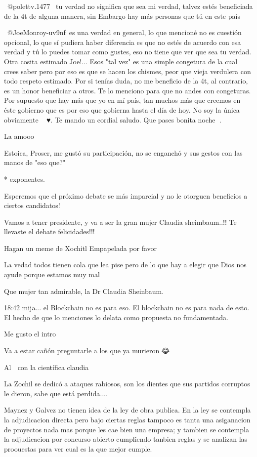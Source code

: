  @polettv.1477  tu verdad no significa que sea mi verdad, talvez estés beneficiada de la 4t de alguna manera, sin Embargo hay más personas que tú en este país

 @JoeMonroy-uv9nf es una verdad en general, lo que mencioné no es cuestión opcional, lo que sí pudiera haber diferencia es que no estés de acuerdo con esa verdad y tú lo puedes tomar como gustes, eso no tiene que ver que sea tu verdad. Otra cosita estimado Joe!... Esos "tal vez" es una  simple congetura de la cual crees saber pero por eso es que se hacen los chismes, peor que vieja verdulera con todo respeto estimado. Por si tenías duda, no me beneficio de la 4t, al contrario, es un honor beneficiar a otros. Te lo menciono para que no andes con congeturas. Por supuesto que hay más que yo en mí país, tan muchos más que creemos en éste gobierno que es por eso que gobierna hasta el día de hoy.   No soy la única obviamente 🙋🏻‍♀️♥️. Te mando un cordial saludo.    Que pases bonita noche 🌃.

La amooo

Estoica, Proser, me gustó su participación, no se enganchó y sus gestos con las manos de "eso que?"

* exponentes.

Esperemos que el próximo debate se más imparcial y no le otorguen beneficios a ciertos candidatos!

Vamos a tener presidente, y va a ser la gran mujer Claudia sheimbaum..!! Te llevaste el debate felicidades!!!

Hagan un meme de Xochitl Empapelada por favor

La vedad todos tienen cola que lea pise pero de lo que hay a elegir que Dios nos ayude porque estamos muy mal

Que mujer tan admirable, la Dr Claudia Sheinbaum.👏👏👏👏👏👏👏👏👏👏👏👏👏👏👏👏👏

18:42 mija... el Blockchain no es para eso.
El blockchain no es para nada de esto.
El hecho de que lo menciones lo delata como propuesta no fundamentada.

Me gusto el intro

Va a estar cañón preguntarle a los que ya murieron 😂

Al 💯 con la científica claudia 👏👏👏👏👏👏

La Zochil se dedicó a ataques rabiosos, son los dientes que sus partidos corruptos le dieron, sabe que está perdida....

Maynez y Galvez no tienen idea de la ley de obra publica. En la ley se contempla la adjudicacion directa pero bajo ciertas reglas tampoco es tanta una asiganacion de proyectos nada mas porque les cae bien una empresa; y tambien se contempla la adjudicacion por concurso abierto cumpliendo tanbien reglas y se analizan las proouestas para ver cual es la que mejor cumple.

